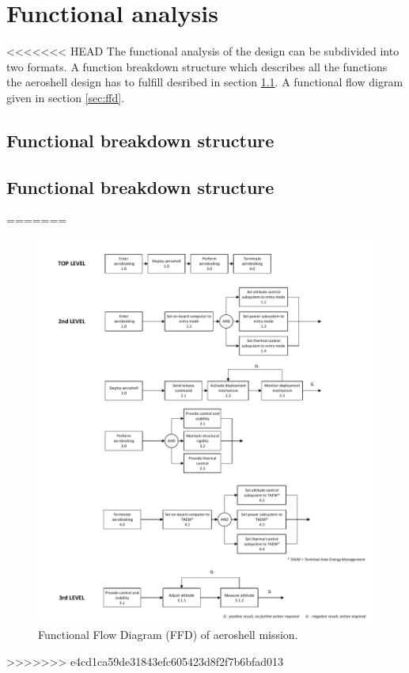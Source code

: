 \section{Functional analysis}\label{ch:func}

<<<<<<< HEAD
The functional analysis of the design can be subdivided into two formats. A function breakdown structure which describes all the functions the aeroshell design has to fulfill desribed in section \ref{sec:fbs}. A functional flow digram given in section \ref{sec:ffd}.

\subsection{Functional breakdown structure} \label{sec:fbs}



\subsection{Functional breakdown structure} \label{sec:ffs}
=======
\begin{figure}[H]
\centering
\includegraphics[width = 1.2\textwidth]{Figure/FFD.pdf}
\caption{Functional Flow Diagram (FFD) of aeroshell mission.}
\label{fig:ffd}
\end{figure}
>>>>>>> e4cd1ca59de31843efc605423d8f2f7b6bfad013
